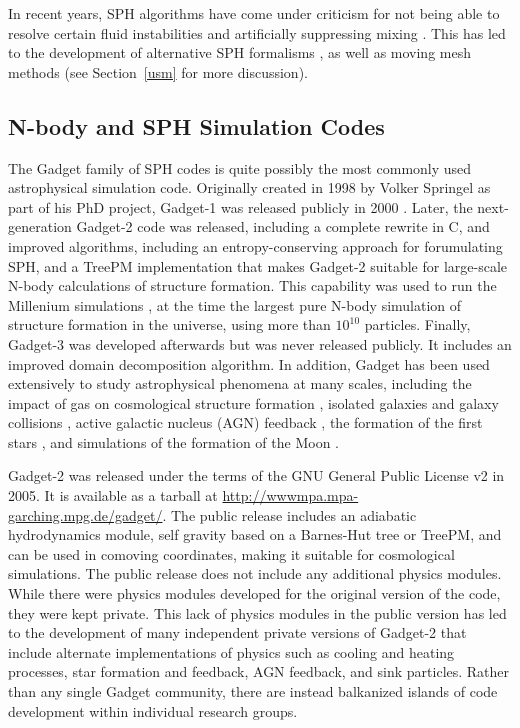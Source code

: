\documentclass[11pt,twoside]{article}
\begin{document}
In recent years, SPH algorithms have come under criticism for not being able to resolve certain fluid instabilities \citep{agertz2007} and artificially suppressing mixing \citep{read2010}. This has led to the development of alternative SPH formalisms \citep{abel2011, hopkins2013}, as well as moving mesh methods (see Section~\ref{usm} for more discussion).

\subsection{N-body and SPH Simulation Codes}

The Gadget family of SPH codes is quite possibly the most commonly used astrophysical simulation code. Originally created in 1998 by Volker Springel as part of his PhD project, Gadget-1 was released publicly in 2000 \citep{springel2001}. Later, the next-generation Gadget-2 code was released, including a complete rewrite in C, and improved algorithms, including an entropy-conserving approach for forumulating SPH, and a TreePM implementation \citep{springel2005b} that makes Gadget-2 suitable for large-scale N-body calculations of structure formation. This capability was used to run the Millenium simulations \citep{springel2005a}, at the time the largest pure N-body simulation of structure formation in the universe, using more than $10^{10}$ particles. Finally, Gadget-3 was developed afterwards but was never released publicly. It includes an improved domain decomposition algorithm. In addition, Gadget has been used extensively to study astrophysical phenomena at many scales, including the impact of gas on cosmological structure formation \citep{keres2009, schaye2015}, isolated galaxies \citep{springel2005c} and galaxy collisions \citep{robertson2006}, active galactic nucleus (AGN) feedback \citep{sijacki2007}, the formation of the first stars \citep{clark2011}, and simulations of the formation of the Moon \citep{jackson2012}.

Gadget-2 was released under the terms of the GNU General Public License v2 in 2005. It is available as a tarball at \url{http://wwwmpa.mpa-garching.mpg.de/gadget/}. The public release includes an adiabatic hydrodynamics module, self gravity based on a Barnes-Hut tree or TreePM, and can be used in comoving coordinates, making it suitable for cosmological simulations. The public release does not include any additional physics modules. While there were physics modules developed for the original version of the code, they were kept private. This lack of physics modules in the public version has led to the development of many independent private versions of Gadget-2 that include alternate implementations of physics such as cooling and heating processes, star formation and feedback, AGN feedback, and sink particles. Rather than any single Gadget community, there are instead balkanized islands of code development within individual research groups.
\end{document}
